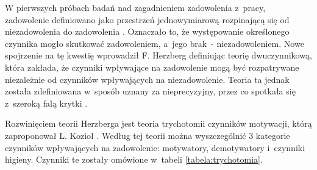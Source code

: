W pierwszych próbach badań nad zagadnieniem zadowolenia z~pracy, zadowolenie definiowano jako przestrzeń jednowymiarową rozpinającą się od niezadowolenia do zadowolenia \cite{sowinska-2014}.
Oznaczało to, że występowanie określonego czynnika mogło skutkować zadowoleniem, a~jego brak~- niezadowoleniem.
Nowe spojrzenie na tę kwestię wprowadził F. Herzberg definiując teorię dwuczynnikową,
która zakłada, że czynniki wpływające na zadowolenie mogą być rozpatrywane niezależnie od czynników wpływających na niezadowolenie.
Teoria ta jednak została zdefiniowana w~sposób uznany za nieprecyzyjny, przez co spotkała się z~szeroką falą krytki \cite{sowinska-2014}.

Rozwinięciem teorii Herzberga jest teoria trychotomii czynników motywacji, którą zaproponował L. Kozioł \cite{koziol-2011}.
Według tej teorii można wyszczególnić 3 kategorie czynników wpływających na zadowolenie: motywatory, demotywatory i~czynniki higieny.
Czynniki te zostały omówione w~tabeli \ref{tabela:trychotomia}.


